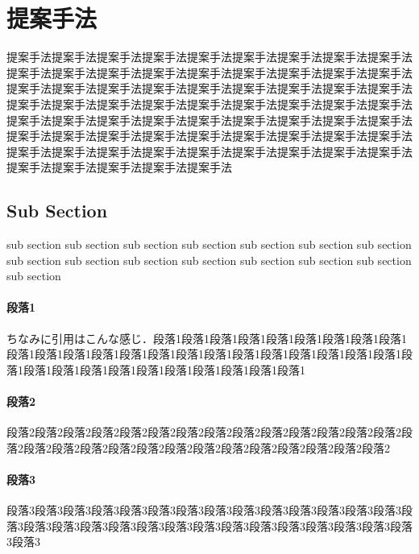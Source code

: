 

\section{提案手法} %
\label{sec:提案手法}

	提案手法提案手法提案手法提案手法提案手法提案手法提案手法提案手法提案手法提案手法提案手法提案手法提案手法提案手法提案手法提案手法提案手法提案手法提案手法提案手法提案手法提案手法提案手法提案手法提案手法提案手法提案手法提案手法提案手法提案手法提案手法提案手法提案手法提案手法提案手法提案手法提案手法提案手法提案手法提案手法提案手法提案手法提案手法提案手法提案手法提案手法提案手法提案手法提案手法提案手法提案手法提案手法提案手法提案手法提案手法提案手法提案手法提案手法提案手法提案手法提案手法提案手法提案手法提案手法提案手法提案手法提案手法提案手法

  \subsection{Sub Section} %
  \label{sub:sub_section}
  	sub section sub section sub section sub section sub section sub section sub section sub section sub section sub section sub section sub section sub section sub section sub section


    \paragraph{段落1} %
    \label{par:段落1}
      ちなみに引用はこんな感じ\cite{abc}．段落1段落1段落1段落1段落1段落1段落1段落1段落1段落1段落1段落1段落1段落1段落1段落1段落1段落1段落1段落1段落1段落1段落1段落1段落1段落1段落1段落1段落1段落1段落1段落1段落1段落1


    \paragraph{段落2} %
    \label{par:段落2}
      段落2段落2段落2段落2段落2段落2段落2段落2段落2段落2段落2段落2段落2段落2段落2段落2段落2段落2段落2段落2段落2段落2段落2段落2段落2段落2段落2段落2


    \paragraph{段落3} %
    \label{par:段落3}
      段落3段落3段落3段落3段落3段落3段落3段落3段落3段落3段落3段落3段落3段落3段落3段落3段落3段落3段落3段落3段落3段落3段落3段落3段落3段落3段落3段落3段落3段落3

